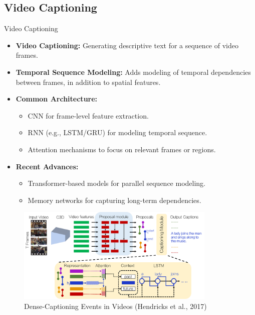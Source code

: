 \subsection{Video Captioning}
\begin{frame}[allowframebreaks]{Video Captioning}
    \begin{itemize}
        \item \textbf{Video Captioning:} Generating descriptive text for a sequence of video frames.
        \item \textbf{Temporal Sequence Modeling:} Adds modeling of temporal dependencies between frames, in addition to spatial features.
        \item \textbf{Common Architecture:} 
        \begin{itemize}
            \item CNN for frame-level feature extraction.
            \item RNN (e.g., LSTM/GRU) for modeling temporal sequence.
            \item Attention mechanisms to focus on relevant frames or regions.
        \end{itemize}
        \item \textbf{Recent Advances:}
        \begin{itemize}
            \item Transformer-based models for parallel sequence modeling.
            \item Memory networks for capturing long-term dependencies.
        \end{itemize}
    \end{itemize}
    \begin{figure}
        \centering
        \includegraphics[width=0.85\textwidth]{images/vision+text/video-captioning-pipeline.png}
        \caption*{Dense-Captioning Events in Videos (Hendricks et al., 2017)}
    \end{figure}
\framebreak
    \begin{figure}

\end{figure}
\end{frame}
